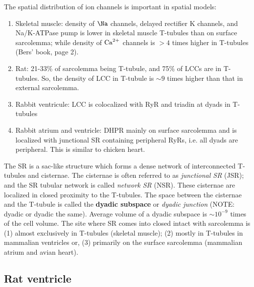 The spatial distribution of ion channels is important in spatial models:
\begin{enumerate}
  \item Skeletal muscle: density of $\Na$ channels, delayed rectifier K
  channels, and Na/K-ATPase pump is lower in skeletal muscle T-tubules than on
  surface sarcolemma; while density of ${\text{Ca}^{2+}}$ channels is $> 4$ times higher in
  T-tubules (Bers' book, page 2).
  
  \item Rat: 21-33\% of sarcolemma being T-tubule, and 75\% of LCCs are in
  T-tubules. So, the density of LCC in T-tubule is $\sim 9$ times higher than
  that in external sarcolemma. 
  
  \item Rabbit ventricule: LCC is colocalized with RyR and triadin at dyads in
  T-tubules
  
  \item Rabbit atrium and ventricle: DHPR mainly on surface sarcolemma and is
  localized with junctional SR containing peripheral RyRs, i.e. all dyads are
  peripheral. This is similar to chicken heart.
\end{enumerate}



The SR is a sac-like structure which forms a dense network of
interconnected T-tubules and cisternae. The cisternae is often
referred to as {\it junctional SR} (JSR); and the SR tubular network
is called {\it network SR} (NSR). These cisternae are localized in
closed proximity to the T-tubules. The space between the cisternae and
the T-tubule is called the {\bf dyadic subspace} or
{\it dyadic junction} (NOTE: dyadic or dyadic the same). Average
volume of a dyadic subspace is $\sim 10^{-9}$ times of the cell
volume. The site where SR comes into closed intact with sarcolemma is (1) almost
exclusively in T-tubules (skeletal muscle); (2) mostly in T-tubules in mammalian
ventricles or, (3) primarily on the surface sarcolemma (mammalian atrium and
avian heart). 





\subsection{Rat ventricle}

